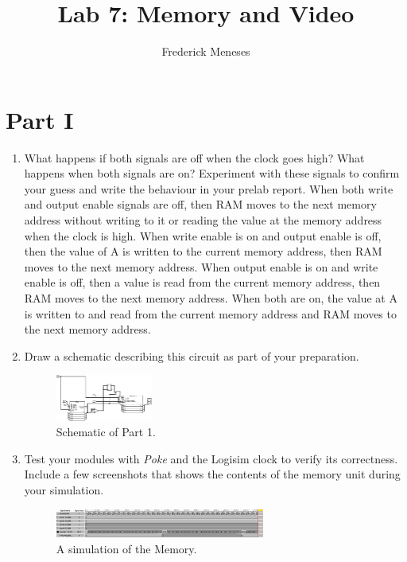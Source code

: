\documentclass{article}
\title{Lab 7: Memory and Video}
\author{Frederick Meneses}
\begin{document}
\maketitle

\section{Part I}

\begin{enumerate}

    \item What happens if both signals are off when the clock goes high? What happens when both signals are on? Experiment with these signals to confirm your guess and write the behaviour in your prelab report. 
    When both write and output enable signals are off, then RAM moves to the next memory address without writing to it or reading the value at the memory address when the clock is high.
    When write enable is on and output enable is off, then the value of A is written to the current memory address, then RAM moves to the next memory address.
    When output enable is on and write enable is off, then a value is read from the current memory address, then RAM moves to the next memory address.
    When both are on, the value at A is written to and read from the current memory address and RAM moves to the next memory address.

    \item Draw a schematic describing this circuit as part of your preparation.
    
\begin{figure}[ht!]
    \centering
    \includegraphics[width=0.3\textwidth]{memory_writer.png}
    \caption{Schematic of Part 1.}
    \label{f:part1}
\end{figure}

    \item Test your modules with \emph{Poke} and the Logisim clock to verify its correctness. Include a few screenshots that shows the contents of the memory unit during your simulation.

\begin{figure}[ht!]
    \centering
    \includegraphics[width=0.65\textwidth]{lab7_Memory Simulation.png}
    \caption{A simulation of the Memory.}
    \label{f:part1_simulation}
\end{figure}


\end{enumerate}
\end{document}
